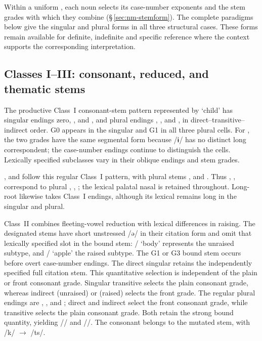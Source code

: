 Within a uniform , each noun selects its case-number exponents and
the stem grades with which they combine (§\,\ref{sec:nm-stemform}). The complete
paradigms below give the singular and plural forms in all three structural
cases. These forms remain available for definite, indefinite and specific
reference where the context supports the corresponding interpretation.

\subsection{Classes I--III: consonant, reduced, and thematic stems}
\label{sec:nm-classes-i-iii}

The productive Class~I consonant-stem pattern represented by  `child' has
singular endings zero, , and , and plural endings
, , and , in direct--transitive--indirect order.
G0 appears in the singular and G1 in all three plural cells. For ,
the two grades have the same segmental form because /ɨ/ has no distinct long
correspondent; the case-number endings continue to distinguish the cells.
Lexically specified subclasses vary in their oblique endings and stem grades.

 ,   and 
 follow this regular Class~I pattern, with plural stems
,  and . Thus ,
,  correspond to plural ,
, ; the lexical palatal nasal is retained
throughout. Long-root   likewise takes Class~I
endings, although its lexical  remains long in the singular
and plural.

Class~II combines fleeting-vowel reduction with lexical differences in raising.
The designated stems have short unstressed  /ə/ in their citation
form and omit that lexically specified slot in the bound stem:
/ `body' represents the unraised subtype, and
/ `apple' the raised subtype. The G1 or G3 bound stem occurs before overt case-number
endings. The direct singular retains the independently specified full citation
stem. This quantitative selection is independent of
the plain or front consonant grade. Singular
transitive  selects the plain consonant grade, whereas indirect 
(unraised) or  (raised) selects the front grade. The regular plural
endings are , , and ; direct and indirect select
the front consonant grade, while transitive selects the plain consonant
grade. Both retain the strong bound quantity, yielding
// and
//. The consonant  belongs to
the mutated stem, with /k/ $\rightarrow$ /ts/.

